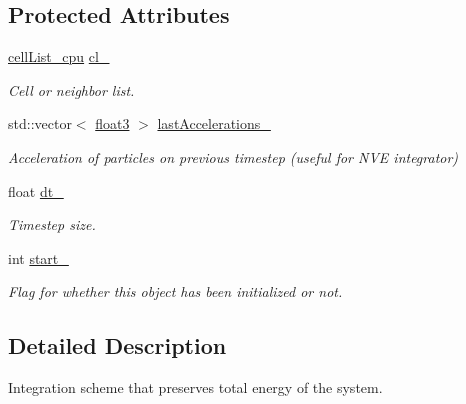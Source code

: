 \subsection*{Protected Attributes}
\begin{DoxyCompactItemize}
\item 
\hypertarget{classintegrator_ad1f7813c9cf3c31898aa7d78fc22232a}{\hyperlink{classcell_list__cpu}{cell\-List\-\_\-cpu} \hyperlink{classintegrator_ad1f7813c9cf3c31898aa7d78fc22232a}{cl\-\_\-}}\label{classintegrator_ad1f7813c9cf3c31898aa7d78fc22232a}

\begin{DoxyCompactList}\small\item\em Cell or neighbor list. \end{DoxyCompactList}\item 
\hypertarget{classintegrator_a3e183a65eb6a777479dca47e7f9a2676}{std\-::vector$<$ \hyperlink{structfloat3}{float3} $>$ \hyperlink{classintegrator_a3e183a65eb6a777479dca47e7f9a2676}{last\-Accelerations\-\_\-}}\label{classintegrator_a3e183a65eb6a777479dca47e7f9a2676}

\begin{DoxyCompactList}\small\item\em Acceleration of particles on previous timestep (useful for N\-V\-E integrator) \end{DoxyCompactList}\item 
\hypertarget{classintegrator_a6e4712b8597e3c40124316d2e9dd5051}{float \hyperlink{classintegrator_a6e4712b8597e3c40124316d2e9dd5051}{dt\-\_\-}}\label{classintegrator_a6e4712b8597e3c40124316d2e9dd5051}

\begin{DoxyCompactList}\small\item\em Timestep size. \end{DoxyCompactList}\item 
\hypertarget{classintegrator_a5b3546a765d8a83b6db8a6d890ace480}{int \hyperlink{classintegrator_a5b3546a765d8a83b6db8a6d890ace480}{start\-\_\-}}\label{classintegrator_a5b3546a765d8a83b6db8a6d890ace480}

\begin{DoxyCompactList}\small\item\em Flag for whether this object has been initialized or not. \end{DoxyCompactList}\end{DoxyCompactItemize}


\subsection{Detailed Description}
Integration scheme that preserves total energy of the system. 

